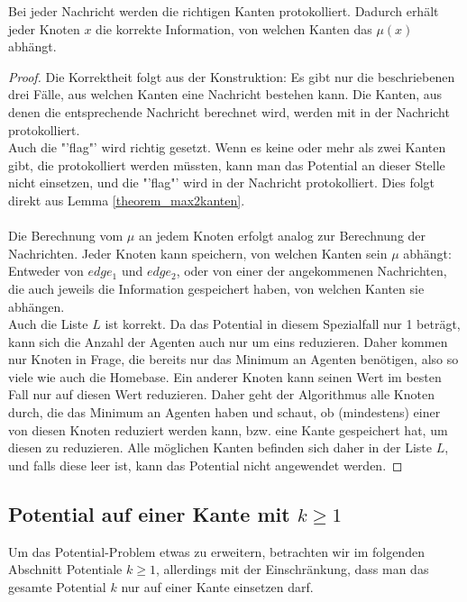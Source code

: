 	\begin{theorem}
		Bei jeder Nachricht werden die richtigen Kanten protokolliert. Dadurch erhält jeder Knoten $x$ die korrekte Information, von welchen Kanten das $\mu(x)$ abhängt. 
	\end{theorem}
	\begin{proof}
		Die Korrektheit folgt aus der Konstruktion: Es gibt nur die beschriebenen drei Fälle, aus welchen Kanten eine Nachricht bestehen kann. Die Kanten, aus denen die entsprechende Nachricht berechnet wird, werden mit in der Nachricht protokolliert.\\
		Auch die "'flag"' wird richtig gesetzt. Wenn es keine oder mehr als zwei Kanten gibt, die protokolliert werden müssten, kann man das Potential an dieser Stelle nicht einsetzen, und die "'flag"' wird in der Nachricht protokolliert. Dies folgt direkt aus Lemma \ref{theorem_max2kanten}.
		\\
		\\
		Die Berechnung vom $\mu$ an jedem Knoten erfolgt analog zur Berechnung der Nachrichten. Jeder Knoten kann speichern, von welchen Kanten sein $\mu$ abhängt: Entweder von $edge_{1}$ und $edge_{2}$, oder von einer der angekommenen Nachrichten, die auch jeweils die Information gespeichert haben, von welchen Kanten sie abhängen.\\
		Auch die Liste $L$ ist korrekt. Da das Potential in diesem Spezialfall nur 1 beträgt, kann sich die Anzahl der Agenten auch nur um eins reduzieren. Daher kommen nur Knoten in Frage, die bereits nur das Minimum an Agenten benötigen, also so viele wie auch die Homebase. Ein anderer Knoten kann seinen Wert im besten Fall nur auf diesen Wert reduzieren. Daher geht der Algorithmus alle Knoten durch, die das Minimum an Agenten haben und schaut, ob (mindestens) einer von diesen Knoten reduziert werden kann, bzw. eine Kante gespeichert hat, um diesen zu reduzieren. Alle möglichen Kanten befinden sich daher in der Liste $L$, und falls diese leer ist, kann das Potential nicht angewendet werden.
		
	\end{proof}


\subsection{Potential auf einer Kante mit $k \geq 1$}\label{kap_pot>=1}


Um das Potential-Problem etwas zu erweitern, betrachten wir im folgenden Abschnitt Potentiale $k \geq 1$, allerdings mit der Einschränkung, dass man das gesamte Potential $k$ nur auf einer Kante einsetzen darf.

